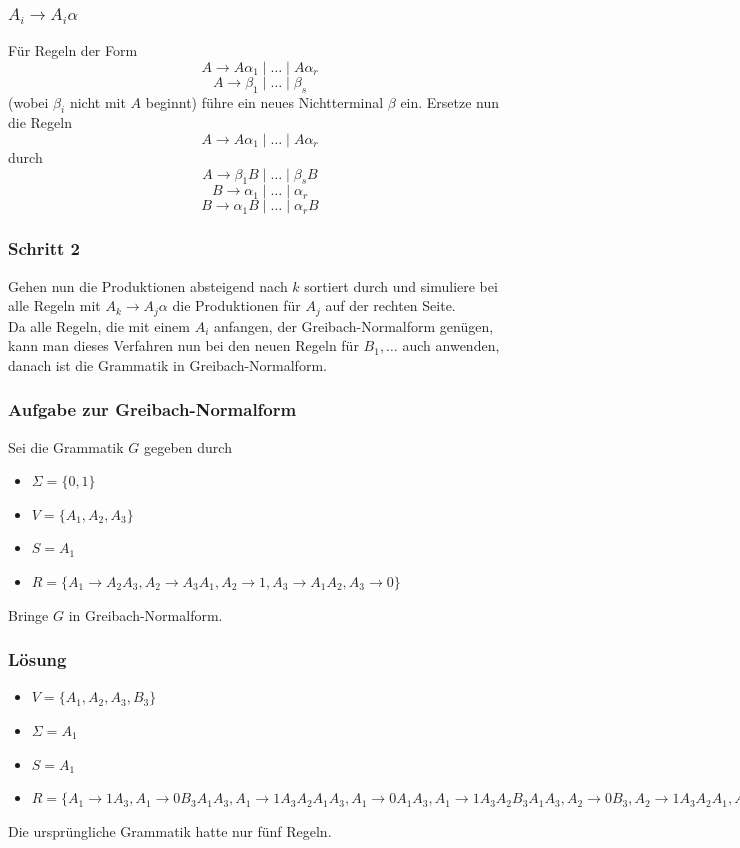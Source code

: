 \begin{frame}
\frametitle{$A_i \rightarrow A_i\alpha$}
Für Regeln der Form 
$$A \rightarrow A\alpha_1 \mid \ldots \mid A\alpha_r$$
$$A \rightarrow \beta_1 \mid \ldots \mid \beta_s$$
(wobei $\beta_i$ nicht mit $A$ beginnt) führe ein neues Nichtterminal $\beta$ ein. Ersetze nun die Regeln
$$A \rightarrow A\alpha_1 \mid \ldots \mid A\alpha_r$$
durch
$$A \rightarrow \beta_1B \mid \ldots \mid \beta_sB$$
$$B \rightarrow \alpha_1 \mid \ldots \mid \alpha_r$$
$$B \rightarrow \alpha_1B \mid \ldots \mid \alpha_rB$$
\end{frame}

\begin{frame}
 \frametitle{Schritt 2}
Gehen nun die Produktionen absteigend nach $k$ sortiert durch und simuliere bei alle Regeln mit $A_k \rightarrow A_j\alpha$ die Produktionen für $A_j$ auf der rechten Seite.\\
Da alle Regeln, die mit einem $A_i$ anfangen, der Greibach-Normalform genügen, kann man dieses Verfahren nun bei den neuen Regeln für $B_1,\ldots$ auch anwenden, danach ist die Grammatik in Greibach-Normalform.
\end{frame}

\begin{frame}
\frametitle{Aufgabe zur Greibach-Normalform}
Sei die Grammatik $G$ gegeben durch
\begin{itemize}
 \item $\Sigma = \{0, 1\}$
 \item $V = \{A_1, A_2, A_3\}$
 \item $S = A_1$
 \item $R = \{A_1 \rightarrow A_2A_3, A_2 \rightarrow A_3A_1, A_2 \rightarrow 1, A_3 \rightarrow A_1A_2, A_3 \rightarrow 0\}$
\end{itemize}

Bringe $G$ in Greibach-Normalform.
\end{frame}

\begin{frame}
	\frametitle{Lösung}
\begin{itemize}
 \item $V=\{A_1, A_2, A_3, B_3\}$
 \item $\Sigma = A_1$
 \item $S = A_1$
 \item $R = \{A_1 \rightarrow 1A_3, A_1 \rightarrow 0B_3A_1A_3, A_1 \rightarrow 1A_3A_2A_1A_3, A_1 \rightarrow 0A_1A_3, A_1 \rightarrow 1A_3A_2B_3A_1A_3,
 A_2 \rightarrow 0B_3, A_2 \rightarrow 1A_3A_2A_1, A_2 \rightarrow 0A_1, A_2 \rightarrow 1A_3A_2B_3A_1, A_2 \rightarrow 1,
 A_3 \rightarrow 0B_3, A_3 \rightarrow 1A_3A_2B_3, A_3 \rightarrow 1A_3A_2, A_3 \rightarrow 0,
 B_3 \rightarrow 1A_3A_2A_2, B_3 \rightarrow 0B_3A_1A_3A_3A_2, B_3 \rightarrow 1A_3A_2A_1A_3A_3A_2, B_3 \rightarrow 0A_1A_3A_3A_2,
 B_3 \rightarrow 1A_3A_2B_3A_1A_3A_3A_2, B_3 \rightarrow 1A_3A_3A_2B_3, B_3 \rightarrow 0B_3A_1A_3A_3A_2B_3, B_3 \rightarrow 1A_3A_2A_1A_3A_3A_2B_3
 B_3 \rightarrow 0A_1A_3A_3A_2B_3, B_3 \rightarrow 1A_3A_2B_3A_1A_3A_3A_2B_3
 \}$
\end{itemize}
\pause
Die ursprüngliche Grammatik hatte nur fünf Regeln.
\end{frame}

